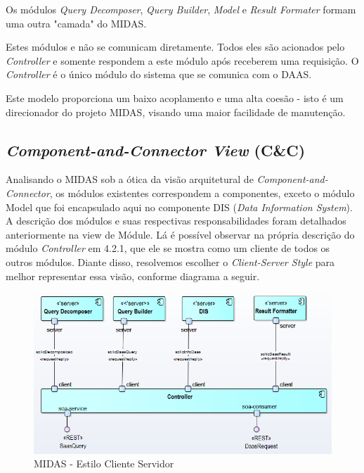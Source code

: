 \documentclass[11pt,a4paper]{article}
\begin{document}
Os módulos \textit{Query Decomposer}, \textit{Query Builder}, \textit{Model} e \textit{Result Formater} formam uma outra "camada" do MIDAS. 

Estes módulos e não se comunicam diretamente. Todos eles são acionados pelo \textit{Controller} e somente respondem a este módulo após receberem uma requisição. O \textit{Controller} é o único módulo do sistema que se comunica com o DAAS. 

Este modelo proporciona um baixo acoplamento e uma alta coesão - isto é um direcionador do projeto MIDAS, visando uma maior facilidade de manutenção. 

\newpage

\subsection{\textit{Component-and-Connector View} (C\&C)}
\label{subsec:cc}
Analisando o MIDAS sob a ótica da visão arquitetural de \textit{Component-and-Connector}, os módulos existentes correspondem a componentes, exceto o módulo Model que foi encapsulado aqui no componente DIS (\textit{Data Information System}). A descrição dos módulos e suas respectivas responsabilidades foram detalhados  anteriormente na view de Módule. Lá é possível observar na própria descrição do módulo \textit{Controller} em 4.2.1, que ele se mostra como um cliente de todos os outros módulos. Diante disso, resolvemos escolher o \textit{Client-Server Style} para melhor representar essa visão, conforme diagrama a seguir. 

\begin{figure} [h!]
  \centering
    \includegraphics[width=1.0\textwidth]{MIDAS_-_Estilo_Cliente_Servidor}
  \caption{MIDAS - Estilo Cliente Servidor}
  \label{cliente}
\end{figure}
\end{document}
